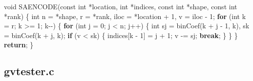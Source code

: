 \documentclass[
  12pt,
]{article}
\newenvironment{Shaded}{\begin{snugshade}}{\end{snugshade}}
\newcommand{\ControlFlowTok}[1]{\textcolor[rgb]{0.13,0.29,0.53}{\textbf{#1}}}
\newcommand{\DataTypeTok}[1]{\textcolor[rgb]{0.13,0.29,0.53}{#1}}
\newcommand{\DecValTok}[1]{\textcolor[rgb]{0.00,0.00,0.81}{#1}}
\newcommand{\NormalTok}[1]{#1}
\begin{document}
\begin{Shaded}
\begin{Highlighting}[]
\DataTypeTok{void}\NormalTok{ SAENCODE(}\DataTypeTok{const} \DataTypeTok{int}\NormalTok{ *location, }\DataTypeTok{int}\NormalTok{ *indices, }\DataTypeTok{const} \DataTypeTok{int}\NormalTok{ *shape,}
              \DataTypeTok{const} \DataTypeTok{int}\NormalTok{ *rank) \{}
  \DataTypeTok{int}\NormalTok{ n = *shape, r = *rank, iloc = *location + }\DecValTok{1}\NormalTok{, v = iloc {-} }\DecValTok{1}\NormalTok{;}
  \ControlFlowTok{for}\NormalTok{ (}\DataTypeTok{int}\NormalTok{ k = r; k \textgreater{}= }\DecValTok{1}\NormalTok{; k{-}{-}) \{}
    \ControlFlowTok{for}\NormalTok{ (}\DataTypeTok{int}\NormalTok{ j = }\DecValTok{0}\NormalTok{; j \textless{} n; j++) \{}
      \DataTypeTok{int}\NormalTok{ sj = binCoef(k + j {-} }\DecValTok{1}\NormalTok{, k), sk = binCoef(k + j, k);}
      \ControlFlowTok{if}\NormalTok{ (v \textless{} sk) \{}
\NormalTok{        indices[k {-} }\DecValTok{1}\NormalTok{] = j + }\DecValTok{1}\NormalTok{;}
\NormalTok{        v {-}= sj;}
        \ControlFlowTok{break}\NormalTok{;}
\NormalTok{      \}}
\NormalTok{    \}}
\NormalTok{  \}}
  \ControlFlowTok{return}\NormalTok{;}
\NormalTok{\}}
\end{Highlighting}
\end{Shaded}

\hypertarget{gvtester.c}{%
\subsection{gvtester.c}\label{gvtester.c}}
\end{document}

